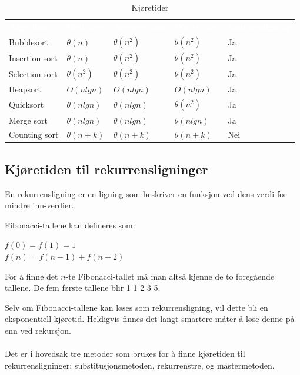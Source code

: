 \begin{table}[H]
    \caption{Kjøretider}
    \label{tab:kjoretider}
    \centering
    \begin{tabular}{|L{8em} | L{8em}|L{8em}| L{8em}|L{8em}|}
        \hline
        \textbf{\textcolor{white}{Algoritme}} & \textbf{\textcolor{white}{Best-case}} & \textbf{\textcolor{white}{Average-case}} & \textbf{\textcolor{white}{Worst-case}} & \textbf{\textcolor{white}{Sammenligning}}\\
        Bubblesort & $\theta(n)$ & $\theta(n^2)$ & $\theta(n^2)$ & Ja\\
        Insertion sort & $\theta(n)$ & $\theta(n^2)$ & $\theta(n^2)$ & Ja\\
        Selection sort & $\theta(n^2)$ & $\theta(n^2)$ & $\theta(n^2)$ & Ja\\
        Heapsort & $O(n lg n)$ & $O(n lg n)$ & $O(n lg n)$ & Ja\\
        Quicksort & $\theta(n lg n)$ & $\theta(n lg n)$ & $\theta(n^2)$ & Ja\\
        Merge sort & $\theta(n lg n)$ & $\theta(n lg n)$ & $\theta(n lg n)$ & Ja\\
        Counting sort & $\theta(n + k)$ & $\theta(n + k)$ & $\theta(n + k)$ & Nei\\
         \hline
    \end{tabular}
\end{table}

\subsection{Kjøretiden til rekurrensligninger}
En rekurrensligning er en ligning som beskriver en funksjon ved dens verdi for mindre inn-verdier. 

\begin{boxed}
Fibonacci-tallene kan defineres som:
\begin{center}
$f(0) = f(1) = 1$\\
$f(n) = f(n-1) + f(n-2)$
\end{center}
\noindent For å finne det $n$-te Fibonacci-tallet må man altså kjenne de to foregående tallene. De fem første tallene blir 1 1 2 3 5.
\end{boxed}

\noindent Selv om Fibonacci-tallene kan løses som rekurrensligning, vil dette bli en eksponentiell kjøretid. Heldigvis finnes det langt smartere måter å løse denne på enn ved rekursjon.
\\\\
Det er i hovedsak tre metoder som brukes for å finne kjøretiden til rekurrensligninger; substitusjonsmetoden, rekurrenstre, og mastermetoden.

